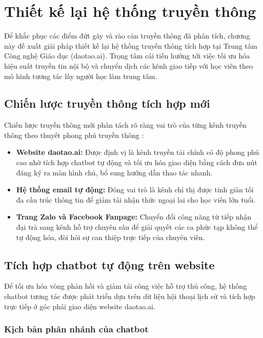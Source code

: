 \section{Thiết kế lại hệ thống truyền thông}

Để khắc phục các điểm đứt gãy và rào cản truyền thông đã phân tích, chương này đề xuất giải pháp thiết kế lại hệ thống truyền thông tích hợp tại Trung tâm Công nghệ Giáo dục (daotao.ai). Trọng tâm cải tiến hướng tới việc tối ưu hóa hiệu suất truyền tin nội bộ và chuyển dịch các kênh giao tiếp với học viên theo mô hình tương tác lấy người học làm trung tâm.

\subsection{Chiến lược truyền thông tích hợp mới}

Chiến lược truyền thông mới phân tách rõ ràng vai trò của từng kênh truyền thông theo thuyết phong phú truyền thông \parencite{daft1986}:
\begin{itemize}
    \item \textbf{Website daotao.ai:} Được định vị là kênh truyền tải chính có độ phong phú cao nhờ tích hợp chatbot tự động và tối ưu hóa giao diện bằng cách đưa nút đăng ký ra màn hình chủ, bổ sung hướng dẫn thao tác nhanh.
    \item \textbf{Hệ thống email tự động:} Đóng vai trò là kênh chỉ thị được tinh giản tối đa cấu trúc thông tin để giảm tải nhận thức ngoại lai cho học viên lớn tuổi.
    \item \textbf{Trang Zalo và Facebook Fanpage:} Chuyển đổi công năng từ tiếp nhận đại trà sang kênh hỗ trợ chuyên sâu để giải quyết các ca phức tạp không thể tự động hóa, đòi hỏi sự can thiệp trực tiếp của chuyên viên.
\end{itemize}

\subsection{Tích hợp chatbot tự động trên website}

Để tối ưu hóa vòng phản hồi và giảm tải công việc hỗ trợ thủ công, hệ thống chatbot tương tác được phát triển dựa trên dữ liệu hội thoại lịch sử và tích hợp trực tiếp ở góc phải giao diện website daotao.ai.

\subsubsection{Kịch bản phân nhánh của chatbot}


